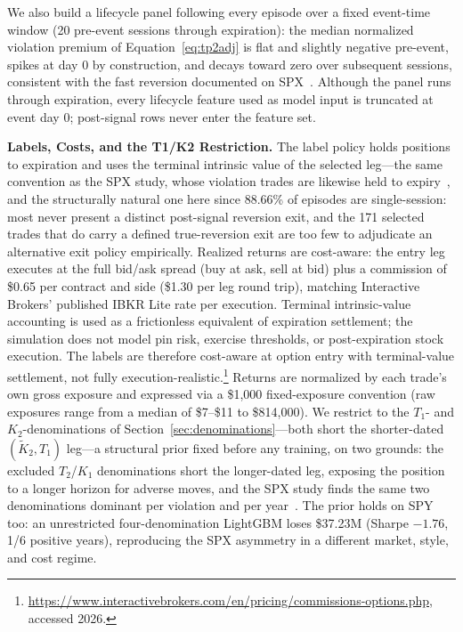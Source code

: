 \documentclass[sigconf,review]{acmart}
\begin{document}
We also build a lifecycle panel following every episode over a fixed event-time window (20 pre-event sessions through expiration): the median normalized violation premium of Equation~\eqref{eq:tp2adj} is flat and slightly negative pre-event, spikes at day 0 by construction, and decays toward zero over subsequent sessions, consistent with the fast reversion documented on SPX~\cite{glasserman2025tp2}. Although the panel runs through expiration, every lifecycle feature used as model input is truncated at event day 0; post-signal rows never enter the feature set.

\medskip\noindent\textbf{Labels, Costs, and the T1/K2 Restriction.}
\label{sec:labels}
The label policy holds positions to expiration and uses the terminal intrinsic value of the selected leg---the same convention as the SPX study, whose violation trades are likewise held to expiry~\cite{glasserman2025tp2}, and the structurally natural one here since 88.66\% of episodes are single-session: most never present a distinct post-signal reversion exit, and the 171 selected trades that do carry a defined true-reversion exit are too few to adjudicate an alternative exit policy empirically.
Realized returns are cost-aware: the entry leg executes at the full bid/ask spread (buy at ask, sell at bid) plus a commission of \$0.65 per contract and side (\$1.30 per leg round trip), matching Interactive Brokers' published IBKR Lite rate per execution. Terminal intrinsic-value accounting is used as a frictionless equivalent of expiration settlement; the simulation does not model pin risk, exercise thresholds, or post-expiration stock execution. The labels are therefore cost-aware at option entry with terminal-value settlement, not fully execution-realistic.\footnote{\url{https://www.interactivebrokers.com/en/pricing/commissions-options.php}, accessed 2026.} Returns are normalized by each trade's own gross exposure and expressed via a \$1{,}000 fixed-exposure convention (raw exposures range from a median of \$7--\$11 to \$814{,}000). We restrict to the $T_1$- and $K_2$-denominations of Section~\ref{sec:denominations}---both short the shorter-dated $(\tilde K_2,T_1)$ leg---a structural prior fixed before any training, on two grounds: the excluded $T_2$/$K_1$ denominations short the longer-dated leg, exposing the position to a longer horizon for adverse moves, and the SPX study finds the same two denominations dominant per violation and per year~\cite{glasserman2025tp2}. The prior holds on SPY too: an unrestricted four-denomination LightGBM loses \$37.23M (Sharpe $-1.76$, 1/6 positive years), reproducing the SPX asymmetry in a different market, style, and cost regime.
\end{document}
